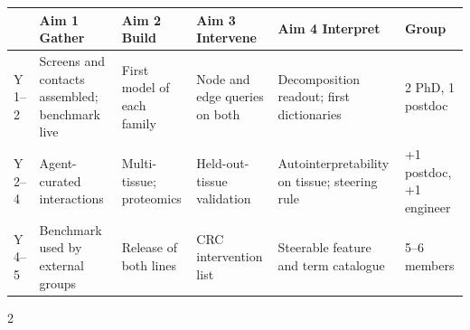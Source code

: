 \documentclass[11pt,a4paper]{article}
\begin{document}
\begin{center}\footnotesize\renewcommand{\arraystretch}{0.9}
\begin{tabular}{@{}p{}p{}p{}p{}p{}p{}@{}}
\toprule
 & Aim 1 Gather & Aim 2 Build & Aim 3 Intervene & Aim 4 Interpret & Group \\
\midrule
Y 1--2 & Screens and contacts assembled; benchmark live & First model of each family & Node and edge queries on both & Decomposition readout; first dictionaries & 2 PhD, 1 postdoc \\
Y 2--4 & Agent-curated interactions & Multi-tissue; proteomics & Held-out-tissue validation & Autointerpretability on tissue; steering rule & +1 postdoc, +1 engineer \\
Y 4--5 & Benchmark used by external groups & Release of both lines & CRC intervention list & Steerable feature and term catalogue & 5--6 members \\
\bottomrule
\end{tabular}
\end{center}

\begin{multicols}{2}\fontsize{8}{9}\selectfont


\end{multicols}
\end{document}
